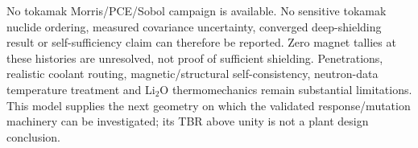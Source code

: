 
No tokamak Morris/PCE/Sobol campaign is available. No sensitive tokamak nuclide ordering, measured covariance uncertainty, converged deep-shielding result or self-sufficiency claim can therefore be reported. Zero magnet tallies at these histories are unresolved, not proof of sufficient shielding. Penetrations, realistic coolant routing, magnetic/structural self-consistency, neutron-data temperature treatment and Li$_2$O thermomechanics remain substantial limitations. This model supplies the next geometry on which the validated response/mutation machinery can be investigated; its TBR above unity is not a plant design conclusion.
